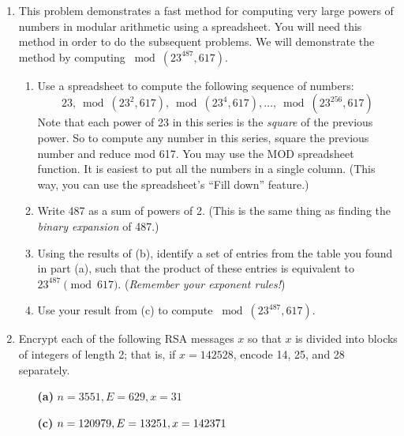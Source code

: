 {\begin{enumerate}
\bf\item \label{ex:powers} \rm
This problem demonstrates a fast method for computing very large powers of numbers in modular arithmetic using a spreadsheet.  You will need this method in order to do the subsequent problems. We will demonstrate the method by computing $\bmod(23^{487} ,617)$.
\begin{enumerate}
\item
Use a spreadsheet to compute the following sequence of numbers:
\[ 23, \bmod(23^2 ,617),\bmod(23^4 ,617),\ldots,\bmod(23^{256} ,617) \]
Note that each power of 23 in this series is the  \emph{square} of the previous power.  So to compute any number in this series, square the previous number and reduce mod 617.  You may use the MOD spreadsheet function.  It is easiest to put all the numbers in a single column. (This way, you can use the spreadsheet's ``Fill down'' feature.)
\item  Write 487 as a sum of powers of 2.  (This is the same thing as finding the \emph{binary expansion} of 487.)
\item Using the results of (b), identify a set of entries from the table you found in part (a), such that the product of these entries is equivalent to $23^{487}  \pmod{617}$.  (\emph{Remember your exponent rules!})
\item 
Use your result from (c) to compute $\bmod(23^{487} ,617)$.
\end{enumerate}
 
\bf\item \label{ex:encode} \rm
Encrypt each of the following RSA messages $x$ so that $x$ is divided
into blocks of integers of length 2;  that is, if $x = 142528$, encode 
14, 25, and 28 separately.
 
 
\vspace{3pt}        %
 
\hspace{-7pt}
\begin{minipage}[t]{4.6in}
\noindent
\begin{minipage}[t]{2.25in}
\begin{itemize}
 
 \item[{\bf (a)}]
$n = 3551, E = 629, x = 31$
 
 \item[{\bf (c)}]
$n = 120979, E = 13251,\\ x = 142371$
 
\end{itemize}
\end{minipage} \hfill
\begin{minipage}[t]{2.25in}
\begin{itemize}
 

\end{itemize}
\end{minipage}
\end{minipage}
\end{enumerate}}
